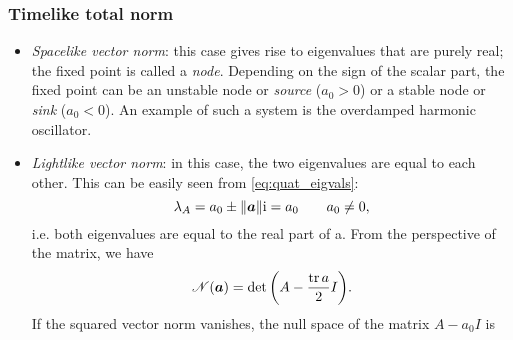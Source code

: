 \subsubsection*{Timelike total norm}
    \begin{itemize}
        \item[\circled{4}] \emph{Spacelike vector norm}: this case gives rise to eigenvalues that are purely real; the fixed point is called a \emph{node}. Depending on the sign of the scalar part, the fixed point can be an unstable node or \emph{source} (\(a_0 > 0\)) or a stable node or \emph{sink} (\(a_0 < 0\)). An example of such a system is the overdamped harmonic oscillator.
        \item[\circled{5}] \emph{Lightlike vector norm}: in this case, the two eigenvalues are equal to each other. This can be easily seen from \cref{eq:quat_eigvals}: 
            \begin{equation}
                \lambda_A = a_0 \pm \norm{\vec{a}}\ii = a_0\qquad a_0 \neq 0,
            \end{equation}
        i.e. both eigenvalues are equal to the real part of a. From the perspective of the matrix, we have
        \begin{equation}
            \mathscr{N}(\vec{a}) = \det\qty(A - \frac{\tr a}{2} I).
        \end{equation}
        If the squared vector norm vanishes, the null space of the matrix $A - a_0 I$ is


\end{itemize}
